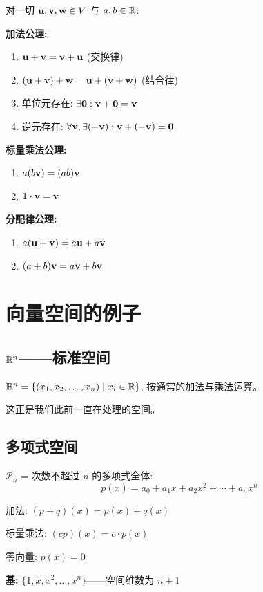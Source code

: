\begin{theorem}[向量空间公理]
对一切 $\mathbf{u}, \mathbf{v}, \mathbf{w} \in V$ 与 $a, b \in \mathbb{R}$:

\textbf{加法公理:}
\begin{enumerate}
    \item $\mathbf{u} + \mathbf{v} = \mathbf{v} + \mathbf{u}$ (交换律)
    \item $(\mathbf{u} + \mathbf{v}) + \mathbf{w} = \mathbf{u} + (\mathbf{v} + \mathbf{w})$ (结合律)
    \item 单位元存在: $\exists \mathbf{0} : \mathbf{v} + \mathbf{0} = \mathbf{v}$
    \item 逆元存在: $\forall \mathbf{v}, \exists (-\mathbf{v}) : \mathbf{v} + (-\mathbf{v}) = \mathbf{0}$
\end{enumerate}

\textbf{标量乘法公理:}
\begin{enumerate}[resume]
    \item $a(b\mathbf{v}) = (ab)\mathbf{v}$
    \item $1 \cdot \mathbf{v} = \mathbf{v}$
\end{enumerate}

\textbf{分配律公理:}
\begin{enumerate}[resume]
    \item $a(\mathbf{u} + \mathbf{v}) = a\mathbf{u} + a\mathbf{v}$
    \item $(a + b)\mathbf{v} = a\mathbf{v} + b\mathbf{v}$
\end{enumerate}
\end{theorem}

\section{向量空间的例子}

\subsection{$\mathbb{R}^n$——标准空间}

\begin{example}
$\mathbb{R}^n = \{(x_1, x_2, \ldots, x_n) \mid x_i \in \mathbb{R}\}$, 按通常的加法与乘法运算。

这正是我们此前一直在处理的空间。
\end{example}

\subsection{多项式空间}

\begin{example}
$\mathcal{P}_n$ = 次数不超过 $n$ 的多项式全体:
\[
p(x) = a_0 + a_1 x + a_2 x^2 + \cdots + a_n x^n
\]

加法: $(p + q)(x) = p(x) + q(x)$

标量乘法: $(cp)(x) = c \cdot p(x)$

零向量: $p(x) = 0$

\textbf{基:} $\{1, x, x^2, \ldots, x^n\}$——空间维数为 $n + 1$
\end{example}

